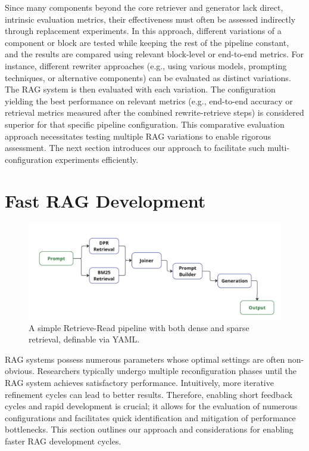 Since many components beyond the core retriever and generator lack direct, intrinsic evaluation metrics, their effectiveness must often be assessed indirectly through replacement experiments. In this approach, different variations of a component or block are tested while keeping the rest of the pipeline constant, and the results are compared using relevant block-level or end-to-end metrics. For instance, different rewriter approaches (e.g., using various models, prompting techniques, or alternative components) can be evaluated as distinct variations. The RAG system is then evaluated with each variation. The configuration yielding the best performance on relevant metrics (e.g., end-to-end accuracy or retrieval metrics measured after the combined rewrite-retrieve steps) is considered superior for that specific pipeline configuration. This comparative evaluation approach necessitates testing multiple RAG variations to enable rigorous assessment. The next section introduces our approach to facilitate such multi-configuration experiments efficiently.

\section{Fast RAG Development}\label{sec:fastrag}

\begin{figure}[b]
    \centering
    \includegraphics[width=\textwidth]{images/showcase-pipeline.pdf}
    \caption{A simple Retrieve-Read pipeline with both dense and sparse retrieval, definable via YAML.}
    \label{fig:showcase}
\end{figure}

RAG systems possess numerous parameters whose optimal settings are often non-obvious. Researchers typically undergo multiple reconfiguration phases until the RAG system achieves satisfactory performance. Intuitively, more iterative refinement cycles can lead to better results. Therefore, enabling short feedback cycles and rapid development is crucial; it allows for the evaluation of numerous configurations and facilitates quick identification and mitigation of performance bottlenecks. This section outlines our approach and considerations for enabling faster RAG development cycles.

